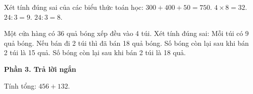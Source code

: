\begin{ex} %
Xét tính đúng sai của các biểu thức toán học:
\choiceTF
{\True $300 + 400 + 50 = 750$.}
{\True $4 \times 8 = 32$.}
{$24 : 3 = 9$.}
{\True $24 : 3 = 8$.}
\end{ex}

\begin{ex} %
Một cửa hàng có 36 quả bóng xếp đều vào 4 túi. Xét tính đúng sai:
\choiceTF
{\True Mỗi túi có 9 quả bóng.}
{\True Nếu bán đi 2 túi thì đã bán 18 quả bóng.}
{Số bóng còn lại sau khi bán 2 túi là 15 quả.}
{\True Số bóng còn lại sau khi bán 2 túi là 18 quả.}
\end{ex}

\textbf{Phần 3. Trả lời ngắn}

\begin{ex} %
Tính tổng: $456 + 132$.
\end{ex}

